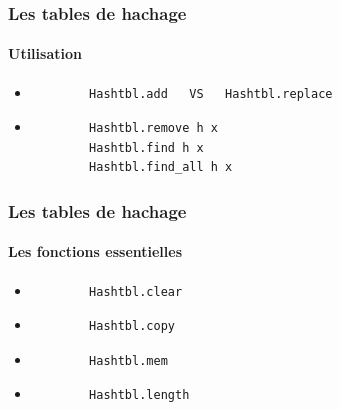 \begin{frame}[fragile]
\frametitle{Les tables de hachage}
\framesubtitle{Utilisation}
	\begin{itemize}
	
	\item
		\begin{lstlisting}
		Hashtbl.add   VS   Hashtbl.replace
		\end{lstlisting}	
	
	\item
		\begin{lstlisting}
		Hashtbl.remove h x
		Hashtbl.find h x
		Hashtbl.find_all h x
		\end{lstlisting}	

	\end{itemize}


\end{frame}

\begin{frame}[fragile]
\frametitle{Les tables de hachage}
\framesubtitle{Les fonctions essentielles}
	\begin{itemize}
	
	\item
		\begin{lstlisting}
		Hashtbl.clear
		\end{lstlisting}

	\item
		\begin{lstlisting}
		Hashtbl.copy
		\end{lstlisting}	

	\item
		\begin{lstlisting}
		Hashtbl.mem
		\end{lstlisting}	

	\item
		\begin{lstlisting}
		Hashtbl.length
		\end{lstlisting}

	\end{itemize}

\end{frame}


